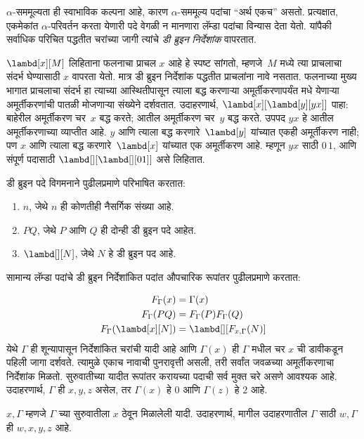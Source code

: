 \documentclass[../../../include/open-logic-section]{subfiles}
\begin{document}


$\alpha$-सममूल्यता ही स्वाभाविक कल्पना आहे, कारण
$\alpha$-सममूल्य पदांचा ``अर्थ एकच'' असतो. प्रत्यक्षात,
एकमेकांत $\alpha$-परिवर्तन करता येणारी पदे वेगळी
न मानणारा लॅम्डा पदांचा विन्यास देता येतो. यांपैकी
सर्वाधिक परिचित पद्धतीत चरांच्या जागी त्यांचे
\emph{डी ब्रुइन निर्देशांक} वापरतात.

$\lambd[x][M]$ लिहिताना फलनाचा प्राचल $x$ आहे हे
स्पष्ट सांगतो, म्हणजे~$M$ मध्ये त्या प्राचलाचा संदर्भ
घेण्यासाठी $x$ वापरता येतो. मात्र डी ब्रुइन निर्देशांक
पद्धतीत प्राचलांना नावे नसतात. फलनाच्या मुख्य भागात
प्राचलाचा संदर्भ हा त्याच्या आस्थितीपासून त्याला बद्ध
करणाऱ्या अमूर्तीकरणापर्यंत मधे येणाऱ्या अमूर्तीकरणांची
पातळी मोजणाऱ्या संख्येने दर्शवतात. उदाहरणार्थ,
$\lambd[x][\lambd[y][y x]]$ पाहा: बाहेरील अमूर्तीकरण
चर~$x$ बद्ध करते; आतील अमूर्तीकरण चर~$y$ बद्ध करते.
उपपद $y x$ हे आतील अमूर्तीकरणाच्या व्याप्तीत आहे.
$y$ आणि त्याला बद्ध करणारे~$\lambd[y]$ यांच्यात
एकही अमूर्तीकरण नाही; पण $x$ आणि त्याला बद्ध
करणारे~$\lambd[x]$ यांच्यात एक अमूर्तीकरण आहे.
म्हणून $y x$ साठी $0\, 1$, आणि संपूर्ण पदासाठी
$\lambd[][\lambd[][01]]$ असे लिहितात.

\begin{defn}
  डी ब्रुइन पदे विगमनाने पुढीलप्रमाणे परिभाषित करतात:
  \begin{enumerate}
  \item $n$, जेथे $n$ ही कोणतीही नैसर्गिक संख्या आहे.
  \item $PQ$, जेथे $P$ आणि $Q$ ही दोन्ही डी ब्रुइन पदे आहेत.
  \item $\lambd[][N]$, जेथे $N$ हे डी ब्रुइन पद आहे.
  \end{enumerate}
\end{defn}

सामान्य लॅम्डा पदांचे डी ब्रुइन निर्देशांकित पदांत
औपचारिक रूपांतर पुढीलप्रमाणे करतात:
\begin{defn}
  \begin{align*}
    F_\Gamma(x) &= \Gamma(x) \\
    F_\Gamma(PQ) &= F_\Gamma(P)F_\Gamma(Q) \\
    F_\Gamma(\lambd[x][N]) &= \lambd[][F_{x,\Gamma}(N)]
  \end{align*}
  येथे $\Gamma$ ही शून्यापासून निर्देशांकित चरांची यादी
  आहे आणि $\Gamma(x)$ ही $\Gamma$ मधील चर $x$ ची
  डावीकडून पहिली जागा दर्शवते. त्यामुळे एकाच नावाची
  पुनरावृत्ती असली, तरी सर्वांत जवळच्या अमूर्तीकरणाचा
  निर्देशांक मिळतो. सुरुवातीच्या यादीत रूपांतर करायच्या
  पदाची सर्व मुक्त चरे असणे आवश्यक आहे. उदाहरणार्थ, $\Gamma$ ही $x,y,z$
  असेल, तर $\Gamma(x)$ हे $0$ आणि $\Gamma(z)$ हे $2$ आहे.

  $x,\Gamma$ म्हणजे $\Gamma$ च्या सुरुवातीला $x$
  ठेवून मिळालेली यादी. उदाहरणार्थ, मागील उदाहरणातील
  $\Gamma$ साठी $w,\Gamma$ ही $w,x,y,z$ आहे.
\end{defn}
\end{document}
